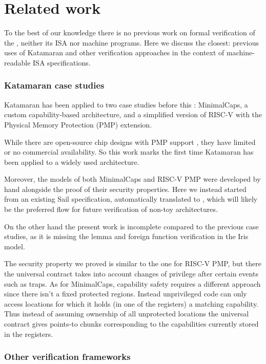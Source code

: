 \chapter{Related work}
\label{ch:related-work}

To the best of our knowledge there is no previous work on formal verification of the \msp, neither its ISA nor machine programs. Here we discuss the closest: previous uses of Katamaran and other verification approaches in the context of machine-readable ISA specifications.

\subsection{Katamaran case studies}

Katamaran has been applied to two case studies before this \cite{Huyghebaert2023}: MinimalCaps, a custom capability-based architecture, and a simplified version of RISC-V with the Physical Memory Protection (PMP) extension.

While there are open-source chip designs with PMP support \cite{ChipsAlliance}, they have limited or no commercial availability. So this work marks the first time Katamaran has been applied to a widely used architecture.

Moreover, the \usail models of both MinimalCaps and RISC-V PMP were developed by hand alongside the proof of their security properties. Here we instead started from an existing Sail specification, automatically translated to \usail, which will likely be the preferred flow for future verification of non-toy architectures.

On the other hand the present work is incomplete compared to the previous case studies, as it is missing the lemma and foreign function verification in the Iris model.

The security property we proved is similar to the one for RISC-V PMP, but there the universal contract takes into account changes of privilege after certain events such as traps. As for MinimalCaps, capability safety requires a different approach since there isn't a fixed protected regions. Instead unprivileged code can only access locations for which it holds (in one of the registers) a matching capability. Thus instead of assuming ownership of all unprotected locations the universal contract gives points-to chunks corresponding to the capabilities currently stored in the registers.

\subsection{Other verification frameworks}

